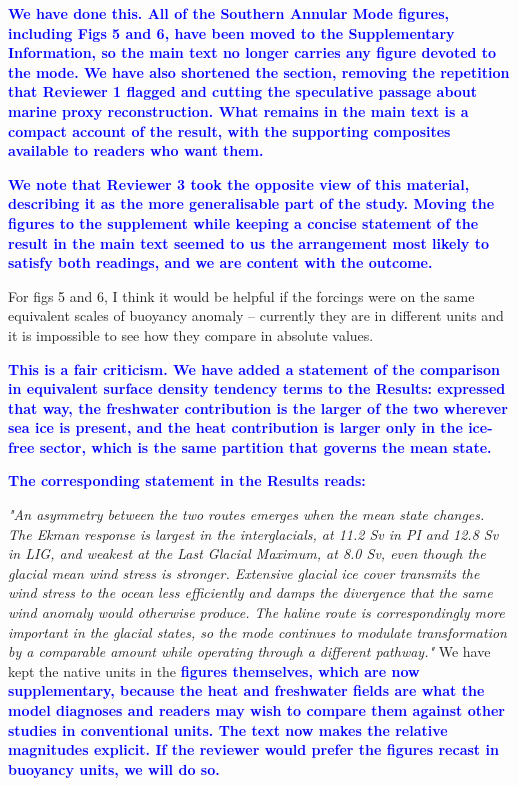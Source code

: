 \documentclass[pdflatex,sn-nature]{sn-jnl}
\begin{document}
\noindent\textcolor{blue}{\textbf{We have done this. All of the Southern Annular Mode figures, including Figs 5 and 6, have been moved to the Supplementary Information, so the main text no longer carries any figure devoted to the mode. We have also shortened the section, removing the repetition that Reviewer 1 flagged and cutting the speculative passage about marine proxy reconstruction. What remains in the main text is a compact account of the result, with the supporting composites available to readers who want them.}}


\noindent\textcolor{blue}{\textbf{We note that Reviewer 3 took the opposite view of this material, describing it as the more generalisable part of the study. Moving the figures to the supplement while keeping a concise statement of the result in the main text seemed to us the arrangement most likely to satisfy both readings, and we are content with the outcome.}}


\medskip
\noindent For figs 5 and 6, I think it would be helpful if the forcings were on the same equivalent scales of buoyancy anomaly -- currently they are in different units and it is impossible to see how they compare in absolute values.
\medskip

\noindent\textcolor{blue}{\textbf{This is a fair criticism. We have added a statement of the comparison in equivalent surface density tendency terms to the Results: expressed that way, the freshwater contribution is the larger of the two wherever sea ice is present, and the heat contribution is larger only in the ice-free sector, which is the same partition that governs the mean state.}}


\noindent\textcolor{blue}{\textbf{The corresponding statement in the Results reads:}}


\medskip
\noindent \textit{"An asymmetry between the two routes emerges when the mean state changes. The Ekman response is largest in the interglacials, at 11.2 Sv in PI and 12.8 Sv in LIG, and weakest at the Last Glacial Maximum, at 8.0 Sv, even though the glacial mean wind stress is stronger. Extensive glacial ice cover transmits the wind stress to the ocean less efficiently and damps the divergence that the same wind anomaly would otherwise produce. The haline route is correspondingly more important in the glacial states, so the mode continues to modulate transformation by a comparable amount while operating through a different pathway."} We have kept the native units in the
\medskip
\noindent\textcolor{blue}{\textbf{figures themselves, which are now supplementary, because the heat and freshwater fields are what the model diagnoses and readers may wish to compare them against other studies in conventional units. The text now makes the relative magnitudes explicit. If the reviewer would prefer the figures recast in buoyancy units, we will do so.}}
\end{document}
